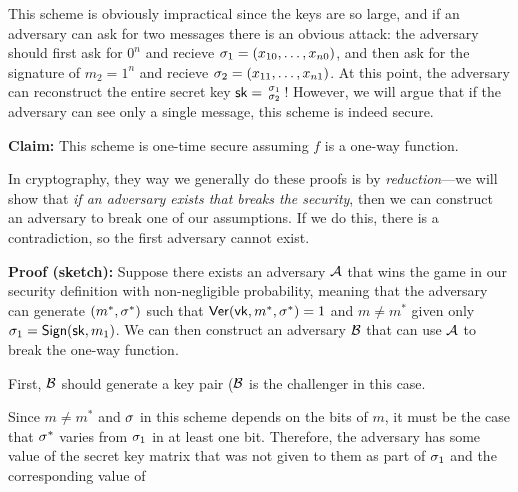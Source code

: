 This scheme is obviously impractical since the keys are so large, and if an adversary can ask for two messages there is an obvious attack: the adversary should first ask for $0^n$ and recieve $\sigma_1 = (x_{10}, \ldots, x_{n0})$, and then ask for the signature of $m_2 = 1^n$ and recieve $\sigma_2 = (x_{11}, \ldots, x_{n1})$. At this point, the adversary can reconstruct the entire secret key ${\mathsf{sk}} = \begin{smallmatrix} \sigma_1 \\ \sigma_2 \end{smallmatrix}$! However, we will argue that if the adversary can see only a single message, this scheme is indeed secure.

\textbf{Claim:} This scheme is one-time secure assuming $f$ is a one-way function.

In cryptography, they way we generally do these proofs is by \emph{reduction}---we will show that \emph{if an adversary exists that breaks the security}, then we can construct an adversary to break one of our assumptions. If we do this, there is a contradiction, so the first adversary cannot exist.

\textbf{Proof (sketch):} Suppose there exists an adversary $\mathcal{A}$ that wins the game in our security definition with non-negligible probability, meaning that the adversary can generate $(m^*, \sigma^*)$ such that $\mathsf{Ver}(\mathsf{vk}, m^*, \sigma^*) = 1$ and $m \neq m^*$ given only $\sigma_1 = \mathsf{Sign}({\mathsf{sk}}, m_1)$. We can then construct an adversary $\mathcal{B}$ that can use $\mathcal{A}$ to break the one-way function.

First, $\mathcal{B}$ should generate a key pair ($\mathcal{B}$ is the challenger in this case.

Since $m \neq m^*$ and $\sigma$ in this scheme depends on the bits of $m$, it must be the case that $\sigma^*$ varies from $\sigma_1$ in at least one bit. Therefore, the adversary has some value of the secret key matrix that was not given to them as part of $\sigma_1$ and the corresponding value of

